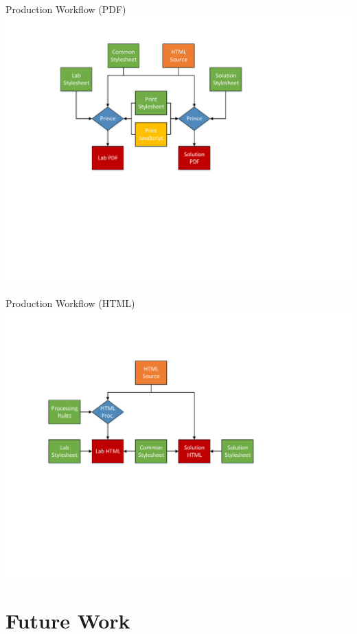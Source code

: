 \documentclass{beamer}
\begin{document}
	\begin{frame}{Production Workflow (PDF)}
		\includegraphics[width=\textwidth, clip=true, trim=1.3in 3in 3in 0.5in]{workflow.pdf}
	\end{frame}			

	\begin{frame}{Production Workflow (HTML)}
		\includegraphics[width=\textwidth, clip=true, trim=1.3in 3in 3in 0.5in]{online-workflow.pdf}
	\end{frame}	
		
	\section{Future Work}
\end{document}

